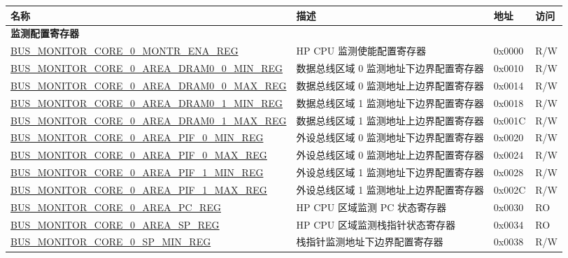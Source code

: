\begin{longtable}{ |p{10cm} | p{9cm}| l | l | }
\hline\rowcolor{lightgray}
{\bfseries 名称} & {\bfseries 描述} &  {\bfseries 地址} & {\bfseries 访问} \\ \hline
\endhead
\multicolumn{4}{|l|}{\textbf{监测配置寄存器}} \\ \hline
\hyperref[regdesc:BUSMONITORCORE0MONTRENAREG]{BUS\_MONITOR\_CORE\_0\_MONTR\_ENA\_REG} & HP CPU 监测使能配置寄存器& 0x0000 & R/W \\ \hline
\hyperref[regdesc:BUSMONITORCORE0AREADRAM00MINREG]{BUS\_MONITOR\_CORE\_0\_AREA\_DRAM0\_0\_MIN\_REG} & 数据总线区域 0 监测地址下边界配置寄存器 & 0x0010 & R/W \\ \hline
\hyperref[regdesc:BUSMONITORCORE0AREADRAM00MAXREG]{BUS\_MONITOR\_CORE\_0\_AREA\_DRAM0\_0\_MAX\_REG} & 数据总线区域 0 监测地址上边界配置寄存器 & 0x0014 & R/W \\ \hline
\hyperref[regdesc:BUSMONITORCORE0AREADRAM01MINREG]{BUS\_MONITOR\_CORE\_0\_AREA\_DRAM0\_1\_MIN\_REG} & 数据总线区域 1 监测地址下边界配置寄存器 & 0x0018 & R/W \\ \hline
\hyperref[regdesc:BUSMONITORCORE0AREADRAM01MAXREG]{BUS\_MONITOR\_CORE\_0\_AREA\_DRAM0\_1\_MAX\_REG} & 数据总线区域 1 监测地址上边界配置寄存器 & 0x001C & R/W \\ \hline
\hyperref[regdesc:BUSMONITORCORE0AREAPIF0MINREG]{BUS\_MONITOR\_CORE\_0\_AREA\_PIF\_0\_MIN\_REG} & 外设总线区域 0 监测地址下边界配置寄存器 & 0x0020 & R/W \\ \hline
\hyperref[regdesc:BUSMONITORCORE0AREAPIF0MAXREG]{BUS\_MONITOR\_CORE\_0\_AREA\_PIF\_0\_MAX\_REG} & 外设总线区域 0 监测地址上边界配置寄存器 & 0x0024 & R/W \\ \hline
\hyperref[regdesc:BUSMONITORCORE0AREAPIF1MINREG]{BUS\_MONITOR\_CORE\_0\_AREA\_PIF\_1\_MIN\_REG} & 外设总线区域 1 监测地址下边界配置寄存器 & 0x0028 & R/W \\ \hline
\hyperref[regdesc:BUSMONITORCORE0AREAPIF1MAXREG]{BUS\_MONITOR\_CORE\_0\_AREA\_PIF\_1\_MAX\_REG} & 外设总线区域 1 监测地址上边界配置寄存器 & 0x002C & R/W \\ \hline
\hyperref[regdesc:BUSMONITORCORE0AREAPCREG]{BUS\_MONITOR\_CORE\_0\_AREA\_PC\_REG} & HP CPU 区域监测 PC 状态寄存器 & 0x0030 & RO \\ \hline
\hyperref[regdesc:BUSMONITORCORE0AREASPREG]{BUS\_MONITOR\_CORE\_0\_AREA\_SP\_REG} & HP CPU 区域监测栈指针状态寄存器  & 0x0034 & RO \\ \hline
\hyperref[regdesc:BUSMONITORCORE0SPMINREG]{BUS\_MONITOR\_CORE\_0\_SP\_MIN\_REG} & 栈指针监测地址下边界配置寄存器 & 0x0038 & R/W \\ \hline

\end{longtable}
